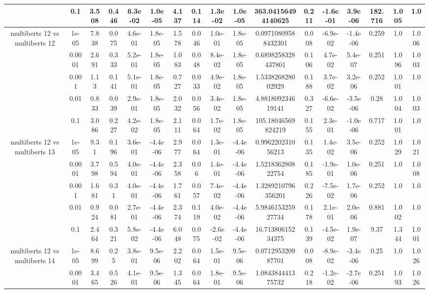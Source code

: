 \begin{tabular}{|c|c|c|c|c|c|c|c|c|c|c|c|c|c|c|c|c|}
 & 0.1 & 3.508 & 0.446 & 6.3e-02 & 1.0e-05 & 4.137 & 0.114 & 1.3e-02 & 1.0e-05 & 363.04156494140625 & 0.211 & -1.6e-01 & 3.9e-06 & 182.716 & 1.005 & 1.0 \\
\hline
\multirow{5}{*}{multiberts 12 vs multiberts 12} & 1e-05 & 7.838 & 0.075 & 4.6e-01 & 1.8e-05 & 1.578 & 0.046 & 1.0e-01 & 1.8e-05 & 0.09710809588432301 & 0.008 & -6.9e-02 & -1.4e-06 & 0.259 & 1.0 & 1.006 \\
 & 0.0001 & 2.691 & 0.333 & 5.2e-01 & 1.8e-05 & 1.083 & 0.048 & 8.4e-02 & 1.8e-05 & 0.6898258328437801 & 0.106 & 4.7e-02 & 5.4e-07 & 0.251 & 1.096 & 1.003 \\
 & 0.001 & 1.13 & 0.141 & 5.1e-01 & 1.8e-05 & 0.727 & 0.033 & 4.9e-02 & 1.8e-05 & 1.533826828002929 & 0.188 & 3.7e-02 & 3.2e-06 & 0.252 & 1.001 & 1.0 \\
 & 0.01 & 0.833 & 0.039 & 2.9e-01 & 1.8e-05 & 2.032 & 0.056 & 3.4e-02 & 1.8e-05 & 4.881809234619141 & 0.327 & -6.6e-02 & -3.5e-06 & 0.28 & 1.004 & 1.003 \\
 & 0.1 & 3.086 & 0.227 & 4.2e-02 & 1.8e-05 & 2.111 & 0.064 & 1.7e-02 & 1.8e-05 & 105.18046569824219 & 0.155 & 2.3e-01 & -1.0e-06 & 0.717 & 1.001 & 1.0 \\
\hline
\multirow{5}{*}{multiberts 12 vs multiberts 13} & 1e-05 & 9.31 & 0.196 & 3.6e-01 & -4.4e-06 & 2.977 & 0.064 & 1.3e-01 & -4.4e-06 & 0.996220231056213 & 0.135 & 1.4e-02 & 3.5e-06 & 0.252 & 1.029 & 1.021 \\
 & 0.0001 & 3.798 & 0.594 & 4.0e-01 & -4.4e-06 & 2.358 & 0.06 & 1.4e-01 & -4.4e-06 & 1.521836280822754 & 0.185 & -1.9e-01 & 1.0e-06 & 0.251 & 1.0 & 1.008 \\
 & 0.001 & 1.681 & 0.31 & 4.0e-01 & -4.4e-06 & 1.761 & 0.057 & 7.4e-02 & -4.4e-06 & 1.3289210796356201 & 0.226 & -7.5e-02 & 1.7e-06 & 0.252 & 1.0 & 1.0 \\
 & 0.01 & 0.924 & 0.081 & 2.7e-01 & -4.4e-06 & 2.374 & 0.119 & 4.0e-02 & -4.4e-06 & 5.984615325927734 & 0.178 & 2.1e-01 & 2.0e-06 & 0.881 & 1.002 & 1.0 \\
 & 0.1 & 2.464 & 0.321 & 5.8e-02 & -4.4e-06 & 6.048 & 0.075 & -2.6e-02 & -4.4e-06 & 16.71380615234375 & 0.139 & -4.5e-02 & 1.9e-07 & 9.37 & 1.344 & 1.001 \\
\hline
\multirow{5}{*}{multiberts 12 vs multiberts 14} & 1e-05 & 8.699 & 0.25 & 3.8e-01 & 9.5e-06 & 2.202 & 0.064 & 1.5e-01 & 9.5e-06 & 0.071295320987701 & 0.008 & -8.9e-02 & -3.4e-06 & 0.25 & 1.0 & 1.026 \\
 & 0.0001 & 3.465 & 0.526 & 4.1e-01 & 9.5e-06 & 1.345 & 0.064 & 1.8e-01 & 9.5e-06 & 1.084384441375732 & 0.218 & -1.2e-02 & -2.7e-06 & 0.251 & 1.093 & 1.026 \\

\end{tabular}
